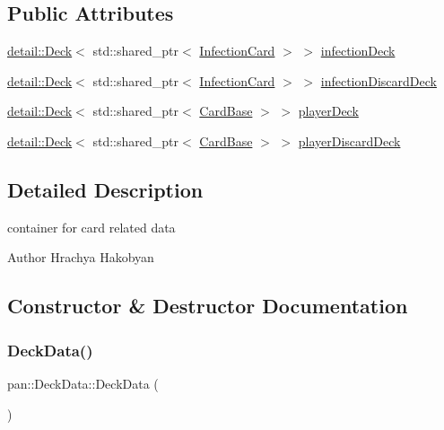 \subsection*{Public Attributes}
\begin{DoxyCompactItemize}
\item 
\hyperlink{classpan_1_1detail_1_1_deck}{detail\+::\+Deck}$<$ std\+::shared\+\_\+ptr$<$ \hyperlink{namespacepan_ad7a96d727f36749dbd39428e2a007de5}{Infection\+Card} $>$ $>$ \hyperlink{structpan_1_1_deck_data_ac5b95082b2a222bd7980874102537882}{infection\+Deck}
\item 
\hyperlink{classpan_1_1detail_1_1_deck}{detail\+::\+Deck}$<$ std\+::shared\+\_\+ptr$<$ \hyperlink{namespacepan_ad7a96d727f36749dbd39428e2a007de5}{Infection\+Card} $>$ $>$ \hyperlink{structpan_1_1_deck_data_a0fd37772f6ccbf2ed921915fe4509d58}{infection\+Discard\+Deck}
\item 
\hyperlink{classpan_1_1detail_1_1_deck}{detail\+::\+Deck}$<$ std\+::shared\+\_\+ptr$<$ \hyperlink{classpan_1_1_card_base}{Card\+Base} $>$ $>$ \hyperlink{structpan_1_1_deck_data_ae1a02cb510f149dd136faa38f1c99fc9}{player\+Deck}
\item 
\hyperlink{classpan_1_1detail_1_1_deck}{detail\+::\+Deck}$<$ std\+::shared\+\_\+ptr$<$ \hyperlink{classpan_1_1_card_base}{Card\+Base} $>$ $>$ \hyperlink{structpan_1_1_deck_data_a7abb11d23c4f8b4a4bd689d8f3780acc}{player\+Discard\+Deck}
\end{DoxyCompactItemize}


\subsection{Detailed Description}
container for card related data 

\begin{DoxyAuthor}{Author}
Hrachya Hakobyan 
\end{DoxyAuthor}


\subsection{Constructor \& Destructor Documentation}
\mbox{\label{structpan_1_1_deck_data_a4db0e346f5a1581e0b0b776d87e18de8}} 
\subsubsection{\texorpdfstring{Deck\+Data()}{DeckData()}\hspace{0.1cm}{\footnotesize\ttfamily [1/3]}}
{\footnotesize\ttfamily pan\+::\+Deck\+Data\+::\+Deck\+Data (\begin{DoxyParamCaption}{ }\end{DoxyParamCaption})}

